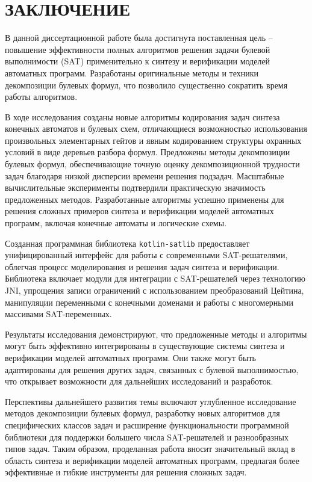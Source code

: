 \chapter*{ЗАКЛЮЧЕНИЕ}

В данной диссертационной работе была достигнута поставленная цель \--- повышение эффективности полных алгоритмов решения задачи булевой выполнимости (SAT) применительно к синтезу и верификации моделей автоматных программ. Разработаны оригинальные методы и техники декомпозиции булевых формул, что позволило существенно сократить время работы алгоритмов.

В ходе исследования созданы новые алгоритмы кодирования задач синтеза конечных автоматов и булевых схем, отличающиеся возможностью использования произвольных элементарных гейтов и явным кодированием структуры охранных условий в виде деревьев разбора формул. Предложены методы декомпозиции булевых формул, обеспечивающие точную оценку декомпозиционной трудности задач благодаря низкой дисперсии времени решения подзадач. Масштабные вычислительные эксперименты подтвердили практическую значимость предложенных методов. Разработанные алгоритмы успешно применены для решения сложных примеров синтеза и верификации моделей автоматных программ, включая конечные автоматы и логические схемы.

Созданная программная библиотека \texttt{kotlin-satlib} предоставляет унифицированный интерфейс для работы с современными SAT-решателями, облегчая процесс моделирования и решения задач синтеза и верификации. Библиотека включает модули для интеграции с SAT-решателей через технологию JNI, упрощения записи ограничений с использованием преобразований Цейтина, манипуляции переменными с конечными доменами и работы с многомерными массивами SAT-переменных.

Результаты исследования демонстрируют, что предложенные методы и алгоритмы могут быть эффективно интегрированы в существующие системы синтеза и верификации моделей автоматных программ.
Они также могут быть адаптированы для решения других задач, связанных с булевой выполнимостью, что открывает возможности для дальнейших исследований и разработок.

Перспективы дальнейшего развития темы включают углубленное исследование методов декомпозиции булевых формул, разработку новых алгоритмов для специфических классов задач и расширение функциональности программной библиотеки для поддержки большего числа SAT-решателей и разнообразных типов задач. Таким образом, проделанная работа вносит значительный вклад в область синтеза и верификации моделей автоматных программ, предлагая более эффективные и гибкие инструменты для решения сложных задач.
